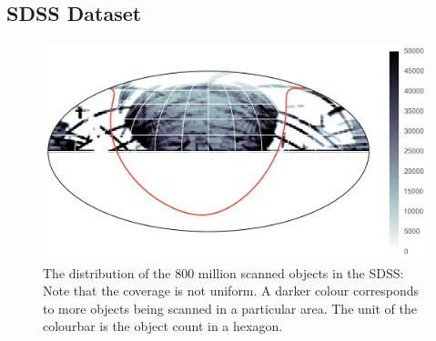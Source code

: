 \subsection{SDSS Dataset} 
\label{sub:sdss}

\begin{figure}[p]
	\centering
	\includegraphics[width=\textwidth]{figures/4_expt1/map_prediction_forest_all}
	\caption[Coverage of the SDSS]{The distribution of the 800 million scanned objects
		in the SDSS: Note that the coverage is not uniform. A darker colour
		corresponds to more objects being scanned in a particular area. The unit
        of the colourbar is the object count in a hexagon.}
	\label{fig:coverage}
\end{figure}

